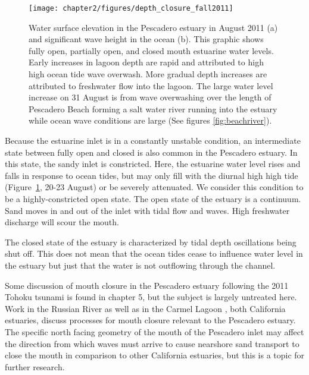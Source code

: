 \begin{figure}
\centering
	\texttt{[image: chapter2/figures/depth\_closure\_fall2011]} \caption{Water surface elevation in the Pescadero estuary in August 2011 (a) and significant wave height in the ocean (b). This graphic shows fully open, partially open, and closed mouth estuarine water levels. Early increases in lagoon depth are rapid and attributed to high high ocean tide wave overwash. More gradual depth increases are attributed to freshwater flow into the lagoon. The large water level increase on 31 August is from wave overwashing over the length of Pescadero Beach forming a salt water river running into the estuary while ocean wave conditions are large (See figures \ref{fig:beachriver}).}
	\label{fig:depthclosuref11} 
\end{figure}

Because the estuarine inlet is in a constantly unstable condition, an intermediate state between fully open and closed is also common in the Pescadero estuary.  In this state, the sandy inlet is constricted. Here, the estuarine water level rises and falls in response to ocean tides, but may only fill with the diurnal high high tide (Figure~\ref{fig:depthclosuref11}, 20-23 August) or be severely attenuated. We consider this condition to be a highly-constricted open state. The open state of the estuary is a continuum. Sand moves in and out of the inlet with tidal flow and waves. High freshwater discharge will scour the mouth.

The closed state of the estuary is characterized by tidal depth oscillations being shut off. This does not mean that the ocean tides cease to influence water level in the estuary but just that the water is not outflowing through the channel.

Some discussion of mouth closure in the Pescadero estuary following the 2011 Tohoku tsunami is found in chapter 5, but the subject is largely untreated here. Work in the Russian River \parencite{behrens_russian_2012, behrens_episodic_2013} as well as in the Carmel Lagoon \parencite{rich_hydrologic_2013}, both California estuaries, discuss processes for mouth closure relevant to the Pescadero estuary. The specific north facing geometry of the mouth of the Pescadero inlet may affect the direction from which waves must arrive to cause nearshore sand transport to close the mouth in comparison to other California estuaries, but this is a topic for further research.

